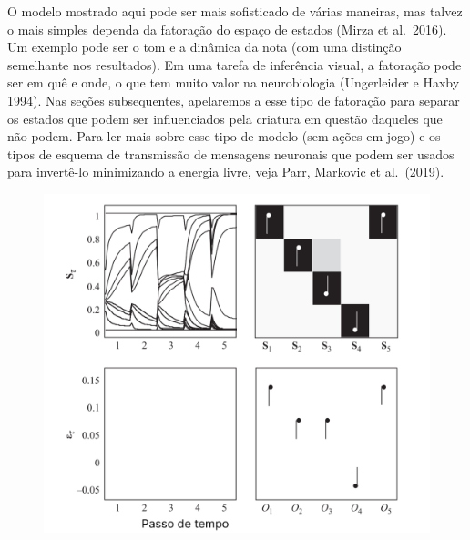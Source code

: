 \documentclass[
  12pt,
]{book}
\begin{document}
O modelo mostrado aqui pode ser mais sofisticado de várias maneiras, mas talvez o mais simples dependa da fatoração do espaço de estados (Mirza et al.~2016). Um exemplo pode ser o tom e a dinâmica da nota (com uma distinção semelhante nos resultados). Em uma tarefa de inferência visual, a fatoração pode ser em quê e onde, o que tem muito valor na neurobiologia (Ungerleider e Haxby 1994). Nas seções subsequentes, apelaremos a esse tipo de fatoração para separar os estados que podem ser influenciados pela criatura em questão daqueles que não podem. Para ler mais sobre esse tipo de modelo (sem ações em jogo) e os tipos de esquema de transmissão de mensagens neuronais que podem ser usados para invertê-lo minimizando a energia livre, veja Parr, Markovic et al.~(2019).

\begin{figure}
\centering
\includegraphics{images/Figura_7_2.png}

\end{figure}
\end{document}
